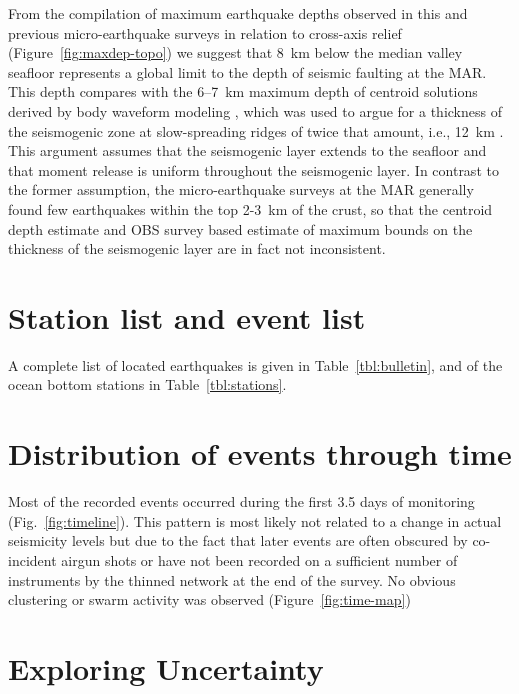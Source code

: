 \documentclass[jgr]{agu2001}
\newlength{\tw}
\begin{document}
\begin{article}
From the compilation of maximum earthquake depths observed in this and
previous micro-earthquake surveys in relation to cross-axis relief
(Figure~\ref{fig:maxdep-topo}) we suggest that 8~km below the median valley
seafloor represents a global limit to the depth of seismic faulting at
the MAR.  This depth compares with the 6--7~km maximum depth of centroid
solutions derived by body waveform modeling \citep{huang88}, which was
used to argue for a thickness of the seismogenic zone at
slow-spreading ridges of twice that
amount, i.e., 12~km \citep{solomon88}.  This argument assumes
that the seismogenic layer extends to the seafloor and that moment
release is uniform throughout the seismogenic layer.  In contrast to
the former assumption, the micro-earthquake surveys at the MAR
generally found few earthquakes within the top 2-3~km of the crust, so
that the centroid depth estimate and OBS survey
based estimate of maximum bounds on the thickness of the seismogenic
layer are in fact not inconsistent.

\appendix

\section{Station list and event list}

A complete list of located earthquakes is given in
Table~\ref{tbl:bulletin}, and of the ocean bottom stations in Table~\ref{tbl:stations}.

\section{Distribution of events through time}

Most of the recorded events occurred during the first 3.5 days of
monitoring (Fig.~\ref{fig:timeline}). This pattern is most likely not
related to a change in actual seismicity levels but due to the fact
that later events are often obscured by co-incident airgun shots or
have not been  recorded  on a sufficient number
of instruments by the thinned network at the end of the survey.   No
obvious clustering or swarm activity was observed (Figure~\ref{fig:time-map})

\section{Exploring Uncertainty}


\end{article}
\end{document}
